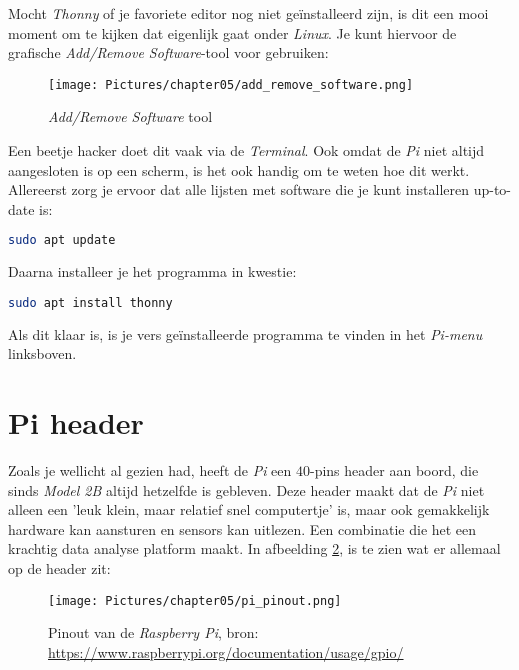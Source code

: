 Mocht \textit{Thonny} of je favoriete editor nog niet geïnstalleerd zijn, is dit een mooi moment om te kijken dat eigenlijk gaat onder \textit{Linux}. Je kunt hiervoor de grafische \textit{Add/Remove Software}-tool voor gebruiken:
\begin{figure}[h!]
\centering\texttt{[image: Pictures/chapter05/add\_remove\_software.png]}
\caption{\textit{Add/Remove Software} tool}
\label{fig:addremovesoftware} %
\end{figure}

\begin{remark}
Een beetje hacker doet dit vaak via de \textit{Terminal}. Ook omdat de \textit{Pi} niet altijd aangesloten is op een scherm, is het ook handig om te weten hoe dit werkt. Allereerst zorg je ervoor dat alle lijsten met software die je kunt installeren up-to-date is:
\begin{lstlisting}[language=bash]
sudo apt update
\end{lstlisting}

Daarna installeer je het programma in kwestie:
\begin{lstlisting}[language=bash]
sudo apt install thonny
\end{lstlisting}
Als dit klaar is, is je vers geïnstalleerde programma te vinden in het \textit{Pi-menu} linksboven.
\end{remark}

\newpage 

\section{Pi header}
Zoals je wellicht al gezien had, heeft de \textit{Pi} een $40$-pins header aan boord, die sinds \textit{Model 2B} altijd hetzelfde is gebleven. Deze header maakt dat de \textit{Pi} niet alleen een 'leuk klein, maar relatief snel computertje' is, maar ook gemakkelijk hardware kan aansturen en sensors kan uitlezen. Een combinatie die het een krachtig data analyse platform maakt. In afbeelding \ref{fig:pi_header}, is te zien wat er allemaal op de header zit: \newline
\begin{figure}[h!]
\centering\texttt{[image: Pictures/chapter05/pi\_pinout.png]}
\caption{Pinout van de \textit{Raspberry Pi}, bron: \url{https://www.raspberrypi.org/documentation/usage/gpio/}}
\label{fig:pi_header} %
\end{figure}

